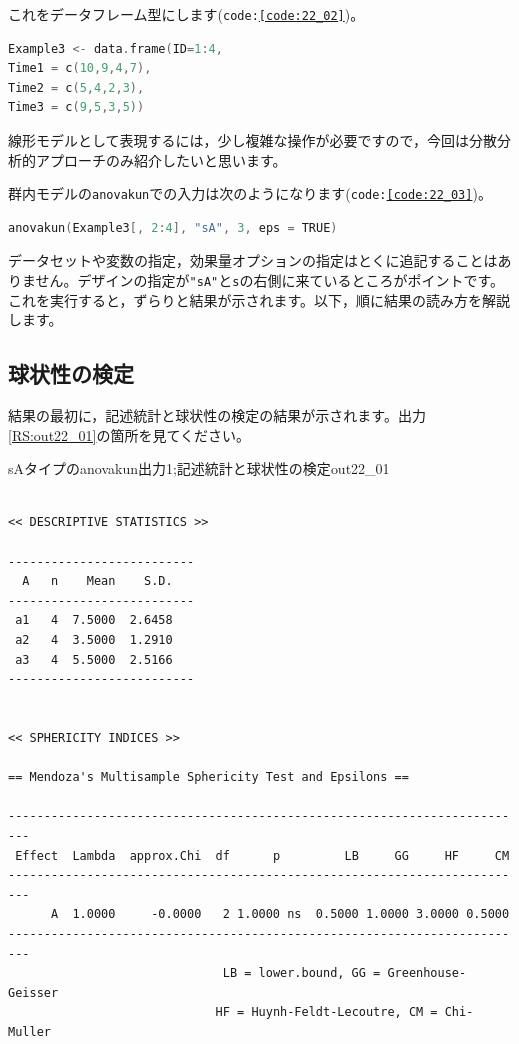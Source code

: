 \documentclass{ltjbook}
\begin{document}
これをデータフレーム型にします(\texttt{code:\ref{code:22_02}})。
\begin{lstlisting}[language=c++,label={code:22_02},caption={データフレームにする}]
Example3 <- data.frame(ID=1:4,
Time1 = c(10,9,4,7),
Time2 = c(5,4,2,3),
Time3 = c(9,5,3,5))
\end{lstlisting}

線形モデルとして表現するには，少し複雑な操作が必要ですので，今回は分散分析的アプローチのみ紹介したいと思います。

群内モデルの\texttt{anovakun}での入力は次のようになります(\texttt{code:\ref{code:22_03}})。
\begin{lstlisting}[language=c++,label={code:22_03},caption={anovakunで実行}]
anovakun(Example3[, 2:4], "sA", 3, eps = TRUE)
\end{lstlisting}
データセットや変数の指定，効果量オプションの指定はとくに追記することはありません。デザインの指定が\texttt{"sA"}と\texttt{s}の右側に来ているところがポイントです。これを実行すると，ずらりと結果が示されます。以下，順に結果の読み方を解説します。

\subsection{球状性の検定}
結果の最初に，記述統計と球状性の検定の結果が示されます。出力\ref{RS:out22_01}の箇所を見てください。

\begin{Rscreen}{sAタイプのanovakun出力1;記述統計と球状性の検定}{out22_01}
	\begin{verbatim}
 
<< DESCRIPTIVE STATISTICS >>

--------------------------
  A   n    Mean    S.D. 
--------------------------
 a1   4  7.5000  2.6458 
 a2   4  3.5000  1.2910 
 a3   4  5.5000  2.5166 
--------------------------


<< SPHERICITY INDICES >>

== Mendoza's Multisample Sphericity Test and Epsilons ==

-------------------------------------------------------------------------
 Effect  Lambda  approx.Chi  df      p         LB     GG     HF     CM 
-------------------------------------------------------------------------
      A  1.0000     -0.0000   2 1.0000 ns  0.5000 1.0000 3.0000 0.5000 
-------------------------------------------------------------------------
                              LB = lower.bound, GG = Greenhouse-Geisser
                             HF = Huynh-Feldt-Lecoutre, CM = Chi-Muller
\end{verbatim}
\end{Rscreen}
\end{document}
